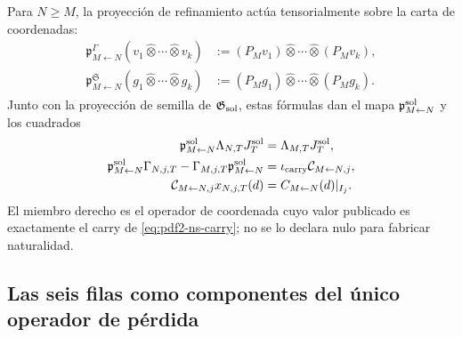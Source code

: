 Para $N\ge M$, la proyección de refinamiento actúa tensorialmente sobre la
carta de coordenadas:
\begin{equation}\label{eq:pdf2-ns-refinement-action}
 \begin{aligned}
 \mathfrak p_{M\leftarrow N}^{\Gamma}
 (v_1\widehat\otimes\cdots\widehat\otimes v_k)
 &:=(P_Mv_1)\widehat\otimes\cdots\widehat\otimes(P_Mv_k),\\
 \mathfrak p_{M\leftarrow N}^{\mathfrak S}
 (g_1\widehat\otimes\cdots\widehat\otimes g_k)
 &:=(P_Mg_1)\widehat\otimes\cdots\widehat\otimes(P_Mg_k).
 \end{aligned}
\end{equation}
Junto con la proyección de semilla de $\mathfrak G_{\rm sol}$, estas fórmulas
dan el mapa $\mathfrak p_{M\leftarrow N}^{\rm sol}$ y los cuadrados
\begin{equation}\label{eq:pdf2-ns-refinement-commutation}
 \begin{aligned}
 \mathfrak p_{M\leftarrow N}^{\rm sol}\Lambda_{N,T}J_T^{\rm sol}
 &=\Lambda_{M,T}J_T^{\rm sol},\\
 \mathfrak p_{M\leftarrow N}^{\rm sol}\Gamma_{N,j,T}
 -\Gamma_{M,j,T}\mathfrak p_{M\leftarrow N}^{\rm sol}
 &=\iota_{\rm carry}\mathcal C_{M\leftarrow N,j},\\
 \mathcal C_{M\leftarrow N,j}x_{N,j,T}(d)
 &=C_{M\leftarrow N}(d)|_{I_j}.
 \end{aligned}
\end{equation}
El miembro derecho es el operador de coordenada cuyo valor publicado es
exactamente el carry de
\eqref{eq:pdf2-ns-carry}; no se lo declara nulo para fabricar naturalidad.

\subsection{Las seis filas como componentes del único operador de pérdida}

